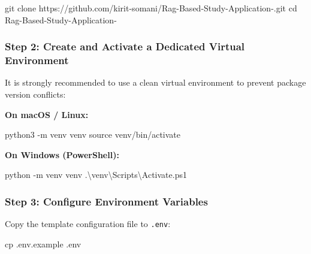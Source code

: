 \documentclass[
]{article}
\newenvironment{Shaded}{}{}
\newcommand{\AttributeTok}[1]{\textcolor[rgb]{0.49,0.56,0.16}{#1}}
\newcommand{\BuiltInTok}[1]{\textcolor[rgb]{0.00,0.50,0.00}{#1}}
\newcommand{\ExtensionTok}[1]{#1}
\newcommand{\FunctionTok}[1]{\textcolor[rgb]{0.02,0.16,0.49}{#1}}
\newcommand{\NormalTok}[1]{#1}
\newcommand{\OperatorTok}[1]{\textcolor[rgb]{0.40,0.40,0.40}{#1}}
\begin{document}
\begin{Shaded}
\begin{Highlighting}[]
\FunctionTok{git}\NormalTok{ clone https://github.com/kirit{-}somani/Rag{-}Based{-}Study{-}Application{-}.git}
\BuiltInTok{cd}\NormalTok{ Rag{-}Based{-}Study{-}Application{-}}
\end{Highlighting}
\end{Shaded}

\subsubsection{Step 2: Create and Activate a Dedicated Virtual
Environment}\label{step-2-create-and-activate-a-dedicated-virtual-environment}

It is strongly recommended to use a clean virtual environment to prevent
package version conflicts:

\textbf{On macOS / Linux:}

\begin{Shaded}
\begin{Highlighting}[]
\ExtensionTok{python3} \AttributeTok{{-}m}\NormalTok{ venv venv}
\BuiltInTok{source}\NormalTok{ venv/bin/activate}
\end{Highlighting}
\end{Shaded}

\textbf{On Windows (PowerShell):}

\begin{Shaded}
\begin{Highlighting}[]
\NormalTok{python }\OperatorTok{{-}}\NormalTok{m venv venv}
\OperatorTok{.}\NormalTok{\textbackslash{}venv\textbackslash{}Scripts\textbackslash{}Activate}\OperatorTok{.}\FunctionTok{ps1}
\end{Highlighting}
\end{Shaded}

\subsubsection{Step 3: Configure Environment
Variables}\label{step-3-configure-environment-variables}

Copy the template configuration file to \texttt{.\allowbreak env}:

\begin{Shaded}
\begin{Highlighting}[]
\FunctionTok{cp}\NormalTok{ .env.example .env}
\end{Highlighting}
\end{Shaded}
\end{document}
